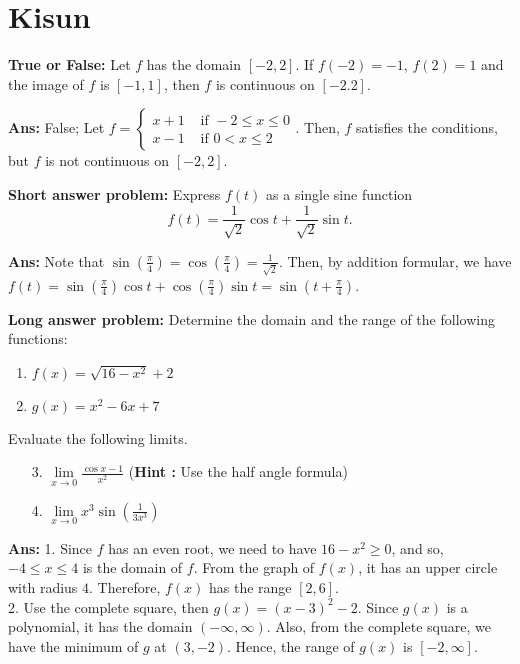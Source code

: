 \documentclass[11pt]{article}
\begin{document}
\section{Kisun}

{\bf True or False:} Let $f$ has the domain $[-2,2]$. If $f(-2)=-1$, $f(2)=1$ and the image of $f$ is $[-1,1]$, then $f$ is continuous on $[-2.2]$.

{\bf Ans:} False; Let $f=\left\{\begin{array}{ll}
x+1 & \text{ if }-2\leq x\leq 0\\
x-1 & \text{ if } 0< x\leq 2
\end{array}\right.$. Then, $f$ satisfies the conditions,  but $f$ is not continuous on $[-2,2]$.

\vspace{1cm}

{\bf Short answer problem:} Express $f(t)$ as a single sine function 
\[f(t)=\frac{1}{\sqrt{2}}\cos t+\frac{1}{\sqrt{2}}\sin t.\]


{\bf Ans:} Note that $\sin(\frac{\pi}{4})=\cos(\frac{\pi}{4})=\frac{1}{\sqrt{2}}$. Then, by addition formular, we have $f(t)=\sin(\frac{\pi}{4})\cos t+\cos(\frac{\pi}{4})\sin t=\sin (t+\frac{\pi}{4})$.

\vspace{1cm}

{\bf Long answer problem:} Determine the domain and the range of the following functions:
\begin{enumerate}
	\item $f(x)=\sqrt{16-x^2}+2$
	\item $g(x)=x^2-6x+7$
\end{enumerate}

Evaluate the following limits.
\begin{enumerate}
	\item[3.] $\lim\limits_{x\rightarrow 0}\frac{\cos x -1}{x^2}$ (\textbf{Hint :} Use the half angle formula)
	\item[4.] $\lim\limits_{x\rightarrow 0}x^3\sin(\frac{1}{3x^3})$
\end{enumerate}
{\bf Ans:} 1. Since $f$ has an even root, we need to have $16-x^2\geq 0$, and so, $-4\leq x\leq 4$ is the domain of $f$. From the graph of $f(x)$, it has an upper circle with radius $4$. Therefore, $f(x)$ has the range $[2,6]$.\\


2. Use the complete square, then $g(x)=(x-3)^2-2$. Since $g(x)$ is a polynomial, it has the domain $(-\infty,\infty)$. Also, from the complete square, we have the minimum of $g$ at $(3,-2)$. Hence, the range of $g(x)$ is $[-2,\infty]$.\\
\end{document}

